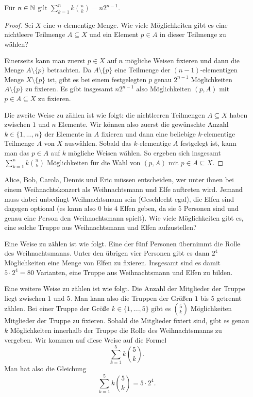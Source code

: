 \begin{prop} \label{doppeltes:abzaehlen} 
	Für $n \in \mathbb{N}$ gilt $\sum\limits_{k=1}^n k \binom{n}{k} = n 2^{n-1}.$ 
\end{prop} 
\begin{proof}
	Sei $X$ eine $n$-elementige Menge. Wie viele Möglichkeiten gibt es eine nichtleere Teilmenge $A \subseteq X$ und ein Element $p \in A$ in dieser Teilmenge zu wählen?
	
	Einerseits kann man zuerst $p \in X$ auf $n$ mögliche Weisen fixieren und dann die Menge $A \setminus \{p\}$ betrachten. Da $A \setminus \{p\}$ eine Teilmenge der $(n-1)$-elementigen Menge $X \setminus \{p\}$ ist, gibt es bei einem festgelegten $p$ genau $2^{n-1}$ Möglichkeiten $A \setminus \{p\}$ zu fixieren. Es gibt insgesamt $n 2^{n-1}$ also Möglichkeiten $(p,A)$ mit $p \in A \subseteq X$ zu fixieren. 
	
	Die zweite Weise zu zählen ist wie folgt: die nichtleeren Teilmengen $A \subseteq X$ haben zwischen $1$ und $n$ Elemente. Wir können also zuerst die gewünschte Anzahl $k \in \{1,\ldots,n\}$ der Elemente in $A$ fixieren und dann eine beliebige $k$-elementige Teilmenge $A$ von $X$ auswählen. Sobald das $k$-elementige $A$ festgelegt ist, kann man das $p \in A$ auf $k$ mögliche Weisen wählen. So ergeben sich insgesamt $\sum\limits_{k=1}^n k \binom{n}{k}$ Möglichkeiten für die Wahl von $(p, A)$ mit $p \in A \subseteq X$. 
\end{proof} 

\begin{bsp}
	Alice, Bob, Carola, Dennis und Eric müssen entscheiden, wer unter ihnen bei einem Weihnachtskonzert als Weihnachtsmann und Elfe auftreten wird.  Jemand  muss dabei unbedingt Weihnachtsmann sein (Geschlecht egal), die Elfen sind dagegen optional (es kann also $0$ bis $4$ Elfen geben, da sie $5$ Personen sind und genau eine Person den Weihnachtsmann spielt). Wie viele Möglichkeiten gibt es, eine solche Truppe aus Weihnachtsmann und Elfen aufzustellen?  
	
	Eine Weise zu zählen ist wie folgt. Eine der fünf Personen übernimmt die Rolle des Weihnachtsmanns. Unter den übrigen vier Personen gibt es dann $2^4$ Möglichkeiten eine Menge von Elfen zu fixieren. Insgesamt sind es damit $5 \cdot 2^4 = 80$ Varianten, eine Truppe aus Weihnachtsmann und Elfen zu bilden.
	
	Eine weitere Weise zu zählen ist wie folgt. Die Anzahl der Mitglieder der Truppe liegt zwischen $1$ und $5$. Man kann also die Truppen der Größen $1$ bis $5$ getrennt zählen. Bei einer Truppe der Größe $k \in \{1,\ldots,5\}$ gibt es $\binom{5}{k}$ Möglichkeiten Mitglieder der Truppe zu fixieren. Sobald die Mitglieder fixiert sind, gibt es genau $k$ Möglichkeiten innerhalb der Truppe die Rolle des Weihnachtsmanns zu vergeben. Wir kommen auf diese Weise auf  die Formel
	\[
			\sum_{k=1}^5 k \binom{5}{k}. 
	\]
	Man hat also die Gleichung 
	\[
			\sum_{k=1}^5 k \binom{5}{k} = 5 \cdot 2^4.
	\]
\end{bsp} 

